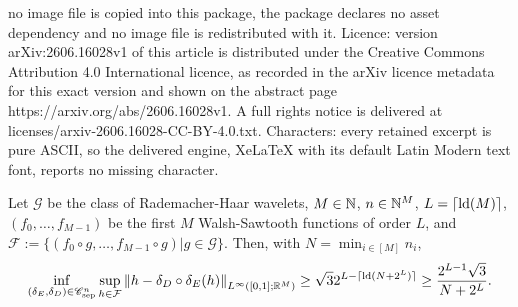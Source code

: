 \documentclass[10pt,a4paper]{amsart}
\newcommand{\defeq}{\mathbin{:=}}
\newcommand{\set}[1]{\ensuremath{\mathcal{#1}}}
\begin{document}
no image file is copied into this package, the package declares no asset dependency and no image file is redistributed with it. Licence: version arXiv:2606.16028v1 of this article is distributed under the Creative Commons Attribution 4.0 International licence, as recorded in the arXiv licence metadata for this exact version and shown on the abstract page https://arxiv.org/abs/2606.16028v1. A full rights notice is delivered at licenses/arxiv-2606.16028-CC-BY-4.0.txt. Characters: every retained excerpt is pure ASCII, so the delivered engine, XeLaTeX with its default Latin Modern text font, reports no missing character.

\begin{theorem}
    \label{thm:wavelet_separated}
    Let $\set{G}$ be the class of Rademacher-Haar wavelets, $M\in\nn$, $n\in\nn[M]$, $L=\lceil\operatorname{ld}(M)\rceil$, $(f_0,\ldots,f_{M-1})$ be the first $M$ Walsh-Sawtooth functions of order $L$, and $\set{F}\defeq \{(f_0\circ g,\ldots,f_{M-1}\circ g)|g\in\set{G}\}$.
    Then, with $N=\min_{i\in[M]}n_i$,
    \begin{align}
        \inf_{(\encoder,\decoder)\in\sepClass[n]}
        \sup_{h\in\set{F}}
        \norm{h-\decoder\circ\encoder(h)}[{L^\infty([0,1];\rr[M])}]
        \geq
        \sqrt{3}
        2^{L-\lceil\ld(N+2^{L})\rceil}
        \geq
        \frac{2^{L-1}\sqrt{3}}{N+2^{L}}.
    \end{align}
\end{theorem}
\end{document}
